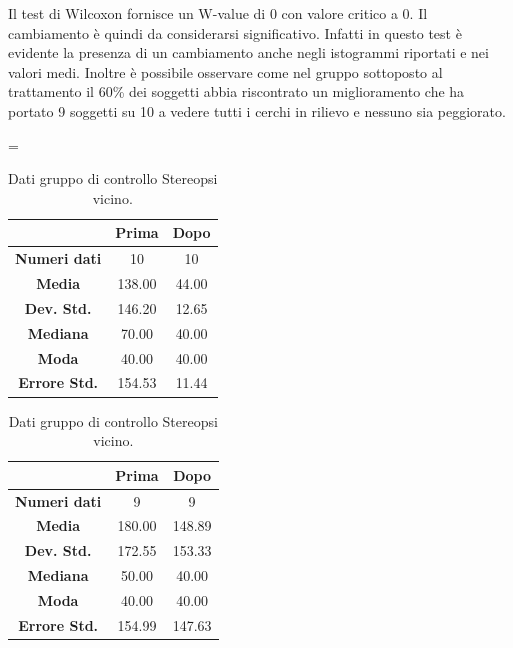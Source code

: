 Il test di Wilcoxon fornisce un W-value di 0 con valore critico a 0. Il cambiamento è quindi da considerarsi significativo. Infatti in questo test è evidente la presenza di un cambiamento anche negli istogrammi riportati e nei valori medi. Inoltre è possibile osservare come nel gruppo sottoposto al trattamento il 60\% dei soggetti abbia riscontrato un miglioramento che ha portato 9 soggetti su 10 a vedere tutti i cerchi in rilievo e nessuno sia peggiorato. 
\begin{table}
\centering
\setlength\tabcolsep{4pt}
\begin{minipage}{0.48\textwidth}
\centering
\tablewidth=\textwidth

\begin{tabular}{|c|c|c|} \hline
{\textbf{}} & {\textbf{  \hspace{8pt}Prima\hspace{8pt} }} & {\textbf{ \hspace{8pt}Dopo\hspace{8pt}  }}\\ \hline
\textbf{Numeri dati} & 10 & 10 \\ 
\textbf{Media} & 138.00 & 44.00 \\  
\textbf{Dev. Std.} & 146.20 & 12.65 \\  
\textbf{Mediana} & 70.00 & 40.00 \\ 
\textbf{Moda} & 40.00 & 40.00 \\ 
\textbf{Errore Std.} & 154.53 & 11.44 \\ 
\hline
\end{tabular}
\caption{Dati gruppo sperimentale Stereopsi vicino.}

\label{tab:accuracy} 
\end{minipage}%
\hfill
\begin{minipage}{0.48\textwidth}
\centering

\begin{tabular}{|c|c|c|} \hline
{\textbf{}} & {\textbf{  \hspace{8pt}Prima\hspace{8pt} }} & {\textbf{ \hspace{8pt}Dopo\hspace{8pt}  }}\\ \hline
\textbf{Numeri dati} & 9 & 9 \\ 
\textbf{Media} & 180.00 & 148.89 \\  
\textbf{Dev. Std.} & 172.55 & 153.33 \\  
\textbf{Mediana} & 50.00 & 40.00 \\  
\textbf{Moda} & 40.00 & 40.00 \\
\textbf{Errore Std.} & 154.99 & 147.63 \\
\hline
\end{tabular}
\caption{Dati gruppo di controllo Stereopsi vicino.}

 \label{tab:ompdiff} 
\end{minipage}
\end{table}
